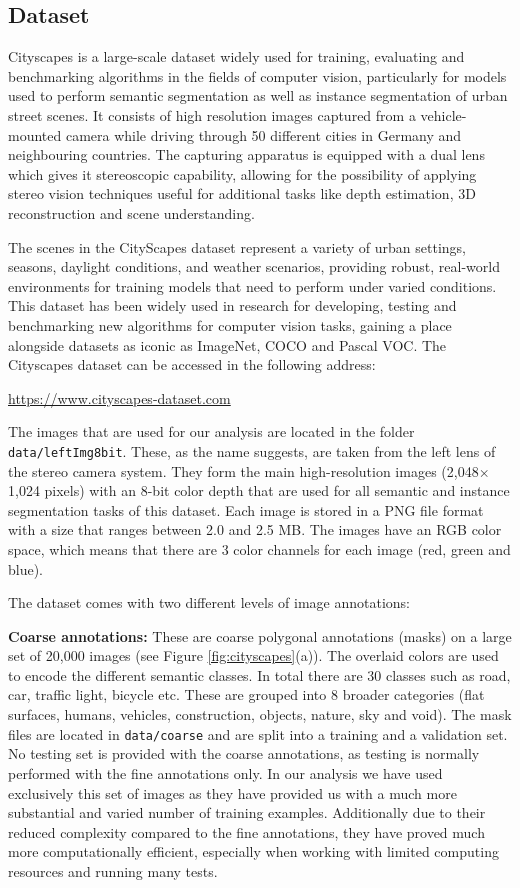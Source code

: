 \subsection{Dataset}

Cityscapes is a large-scale dataset widely used for training, evaluating and benchmarking algorithms in the fields of computer vision, particularly for models used to perform semantic segmentation as well as instance segmentation of urban street scenes. It consists of high resolution images captured from a vehicle-mounted camera while driving through 50 different cities in Germany and neighbouring countries. The capturing apparatus is equipped with a dual lens which gives it stereoscopic capability, allowing for the possibility of applying stereo vision techniques useful for additional tasks like depth estimation, 3D reconstruction and scene understanding. 

The scenes in the CityScapes dataset represent a variety of urban settings, seasons, daylight conditions, and weather scenarios, providing robust, real-world environments for training models that need to perform under varied conditions. This dataset has been widely used in research for developing, testing and benchmarking new algorithms for computer vision tasks, gaining a place alongside datasets as iconic as ImageNet, COCO and Pascal VOC. The Cityscapes dataset can be accessed in the following address:
\begin{center}
\url{https://www.cityscapes-dataset.com}
\end{center}

The images that are used for our analysis are located in the folder \texttt{data/leftImg8bit}. These, as the name suggests, are taken from the left lens of the stereo camera system. They form the main high-resolution images (2,048$\times$1,024 pixels) with an 8-bit color depth that are used for all semantic and instance segmentation tasks of this dataset. Each image is stored in a PNG file format with a size that ranges between 2.0 and 2.5 MB. The images have an RGB color space, which means that there are 3 color channels for each image (red, green and blue).

The dataset comes with two different levels of image annotations:

\textbf{Coarse annotations:} These are coarse polygonal annotations (masks) on a large set of 20,000 images (see Figure \ref{fig:cityscapes}(a)). The overlaid colors are used to encode the different semantic classes. In total there are 30 classes such as road, car, traffic light, bicycle etc. These are grouped into 8 broader categories (flat surfaces, humans, vehicles, construction, objects, nature, sky and void). The mask files are located in \small\texttt{data/coarse} and are split into a training and a validation set. No testing set is provided with the coarse annotations, as testing is normally performed with the fine annotations only. In our analysis we have used exclusively this set of images as they have provided us with a much more substantial and varied number of training examples. Additionally due to their reduced complexity compared to the fine annotations, they have proved much more computationally efficient, especially when working with limited computing resources and running many tests.

